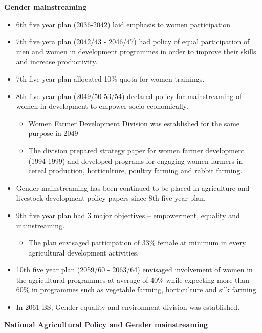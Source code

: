 \documentclass[
  openany]{book}
\providecommand{\tightlist}{%
  \setlength{\itemsep}{0pt}\setlength{\parskip}{0pt}}
\begin{document}
\textbf{Gender mainstreaming}

\begin{itemize}
\tightlist
\item
  6th five year plan (2036-2042) laid emphasis to women participation
\item
  7th five yera plan (2042/43 - 2046/47) had policy of equal participation of men and women in development programmes in order to improve their skills and increase productivity.
\item
  7th five year plan allocated 10\% quota for women trainings.
\item
  8th five year plan (2049/50-53/54) declared policy for mainstreaming of women in development to empower socio-economically.

  \begin{itemize}
  \tightlist
  \item
    Women Farmer Development Division was established for the same purpose in 2049
  \item
    The division prepared strategy paper for women farmer development (1994-1999) and developed programs for engaging women farmers in cereal production, horticulture, poultry farming and rabbit farming.
  \end{itemize}
\item
  Gender mainstreaming has been continued to be placed in agriculture and livestock development policy papers since 8th five year plan.
\item
  9th five year plan had 3 major objectives -- empowerment, equality and mainstreaming.

  \begin{itemize}
  \tightlist
  \item
    The plan envisaged participation of 33\% female at minimum in every agricultural development activities.
  \end{itemize}
\item
  10th five year plan (2059/60 - 2063/64) envisaged involvement of women in the agricultural programmes at average of 40\% while expecting more than 60\% in programmes such as vegetable farming, horticulture and silk farming.
\item
  In 2061 BS, Gender equality and environment division was established.
\end{itemize}

\textbf{National Agricultural Policy and Gender mainstreaming}
\end{document}

